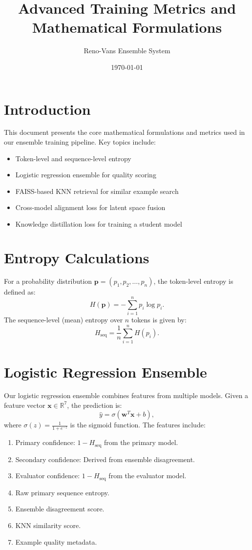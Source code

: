 \documentclass[11pt]{article}
\title{Advanced Training Metrics and Mathematical Formulations}
\author{Reno-Vans Ensemble System}
\date{\today}
\begin{document}
\maketitle

\section{Introduction}
This document presents the core mathematical formulations and metrics used in our ensemble training pipeline. Key topics include:
\begin{itemize}
    \item Token-level and sequence-level entropy
    \item Logistic regression ensemble for quality scoring
    \item FAISS-based KNN retrieval for similar example search
    \item Cross-model alignment loss for latent space fusion
    \item Knowledge distillation loss for training a student model
\end{itemize}

\section{Entropy Calculations}
For a probability distribution $\mathbf{p} = (p_1, p_2, \dots, p_n)$, the token-level entropy is defined as:
\begin{equation}
    H(\mathbf{p}) = -\sum_{i=1}^{n} p_i \log p_i.
\end{equation}
The sequence-level (mean) entropy over $n$ tokens is given by:
\begin{equation}
    H_{\text{seq}} = \frac{1}{n}\sum_{i=1}^{n} H(p_i).
\end{equation}

\section{Logistic Regression Ensemble}
Our logistic regression ensemble combines features from multiple models. Given a feature vector $\mathbf{x} \in \mathbb{R}^7$, the prediction is:
\begin{equation}
    \hat{y} = \sigma(\mathbf{w}^T \mathbf{x} + b),
\end{equation}
where $\sigma(z) = \frac{1}{1+e^{-z}}$ is the sigmoid function. The features include:
\begin{enumerate}
    \item Primary confidence: $1 - H_{\text{seq}}$ from the primary model.
    \item Secondary confidence: Derived from ensemble disagreement.
    \item Evaluator confidence: $1 - H_{\text{seq}}$ from the evaluator model.
    \item Raw primary sequence entropy.
    \item Ensemble disagreement score.
    \item KNN similarity score.
    \item Example quality metadata.
\end{enumerate}
\end{document}
